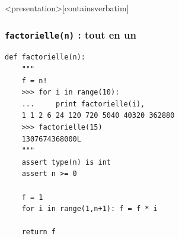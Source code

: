 \begin{frame}<presentation>[containsverbatim]
\frametitle{{\tt factorielle(n)} : tout en un}
\footnotesize
\begin{lstlisting}
def factorielle(n):
    """
    f = n!
    >>> for i in range(10):
    ...     print factorielle(i),
    1 1 2 6 24 120 720 5040 40320 362880
    >>> factorielle(15)
    1307674368000L
    """
    assert type(n) is int
    assert n >= 0

    f = 1
    for i in range(1,n+1): f = f * i

    return f
\end{lstlisting}

\end{frame}


